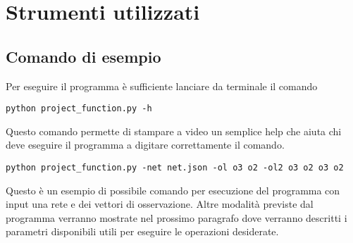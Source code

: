 \section{Strumenti utilizzati}
\subsection{Comando di esempio}
Per eseguire il programma è sufficiente lanciare da terminale il comando

\texttildelow
\texttt{python project\_function.py -h}

Questo comando permette di stampare a video un semplice help che aiuta chi deve eseguire il programma a digitare correttamente il comando.

\texttildelow
\texttt{python project\_function.py -net net.json -ol o3 o2 -ol2 o3 o2 o3 o2}

Questo è un esempio di possibile comando per esecuzione del programma con input una rete e dei vettori di osservazione. Altre modalità previste dal programma verranno mostrate nel prossimo paragrafo dove verranno descritti i parametri disponibili utili per eseguire le operazioni desiderate. 
